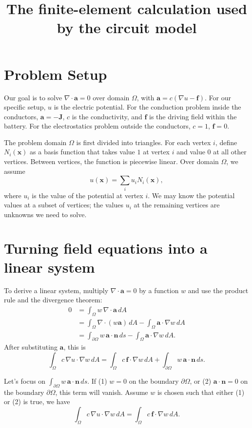 \documentclass[11pt]{article}
\title{The finite-element calculation used by the circuit model}
\author{}
\date{}
\begin{document}
\maketitle

\section{Problem Setup}
Our goal is to solve $\nabla\cdot\bm a=0$ over domain $\Omega$, with
$\bm a=c(\nabla u-\bm f)$. For our specific setup, $u$ is the electric potential.
For the conduction problem inside the conductors, $\bm a = -\bm J$, $c$ is the conductivity,
and $\bm f$ is the driving field within the battery.
For the electrostatics problem outside the conductors, $c=1$, $\bm f=0$.

The problem domain $\Omega$ is first divided into triangles. For each vertex $i$,
define $N_i(\bm x)$ as a basis function that takes value $1$ at vertex $i$ and value $0$ at all
other vertices. Between vertices, the function is piecewise linear. Over domain $\Omega$,
we assume
\begin{equation}
    u(\bm x) = \sum_i u_i N_i(\bm x),
\end{equation}
where $u_i$ is the value of the potential at vertex $i$.
We may know the potential values at a subset of vertices; the
values $u_i$ at the remaining vertices are unknowns we need to solve.

\section{Turning field equations into a linear system}
To derive a linear system, multiply $\nabla\cdot\bm a=0$ by a function $w$ and use the
product rule and the divergence theorem:
\begin{align}
 0
 &=\int_\Omega w\,\nabla\cdot\bm a\,dA \\
 &=\int_\Omega\nabla\cdot(w\bm a)\,dA
   -\int_\Omega\bm a\cdot\nabla w\,dA \\
 &=\int_{\partial\Omega}w\,\bm a\cdot\bm n\,ds
   -\int_\Omega\bm a\cdot\nabla w\,dA .
\end{align}
After substituting $\bm a$, this is
\begin{equation}
 \int_\Omega c\,\nabla u\cdot\nabla w\,dA
 =\int_\Omega c\,\bm f\cdot\nabla w\,dA
  +\int_{\partial\Omega}w\,\bm a\cdot\bm n\,ds .
 \label{eq:with-boundary}
\end{equation}

Let's focus on $\int_{\partial\Omega}w\,\bm a\cdot\bm n\,ds$. If (1) $w=0$ on
the boundary $\partial\Omega$, or (2) $\bm a\cdot\bm n = 0$ on the boundary
$\partial\Omega$, this term will vanish. Assume $w$ is chosen such that either
(1) or (2) is true, we have
\begin{equation}
 \int_\Omega c\,\nabla u\cdot\nabla w\,dA
 =\int_\Omega c\,\bm f\cdot\nabla w\,dA .
 \label{eq:weak}
\end{equation}
\end{document}
